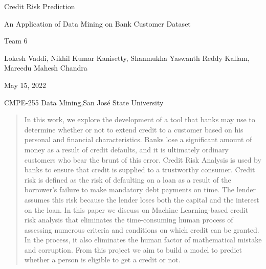 \documentclass[12pt]{article}
\newcommand\titleofdoc{Credit Risk Prediction} %
\newcommand\GroupName{Team 6} %
\begin{document}
\begin{titlepage}
   \begin{center}
        \vspace*{4cm} %

        \Huge{\titleofdoc} 

        \vspace{0.5cm}
        \LARGE{An Application of Data Mining on Bank Customer Dataset}
            
        \vspace{3 cm}
        \Large{\GroupName}
       
        \vspace{0.25cm}
        \large{Lokesh Vaddi, Nikhil Kumar Kanisetty, Shanmukha Yaswanth Reddy Kallam, Mareedu Mahesh Chandra}
       
        \vspace{3 cm}
        \Large{May 15, 2022}
        
        \vspace{0.25 cm}
        \Large{CMPE-255 Data Mining,San José State University}
       

       \vfill
    \end{center}
\end{titlepage}

\setcounter{page}{2}
\pagestyle{fancy}
\fancyhf{}
\rhead{\thepage}
\lhead{\GroupName; \titleofdoc}


\begin{abstract}

In this work, we explore the development of a tool that banks may use to determine whether or not to extend credit to a customer based on his personal and financial characteristics. Banks lose a significant amount of money as a result of credit defaults, and it is ultimately ordinary customers who bear the brunt of this error. Credit Risk Analysis is used by banks to ensure that credit is supplied to a trustworthy consumer. Credit risk is defined as the risk of defaulting on a loan as a result of the borrower's failure to make mandatory debt payments on time. The lender assumes this risk because the lender loses both the capital and the interest on the loan. In this paper we discuss on Machine Learning-based credit risk analysis that eliminates the time-consuming human process of assessing numerous criteria and conditions on which credit can be granted. In the process, it also eliminates the human factor of mathematical mistake and corruption. From this project we aim to build a model to predict whether a person is eligible to get a credit or not. 

\end{abstract}
\end{document}
